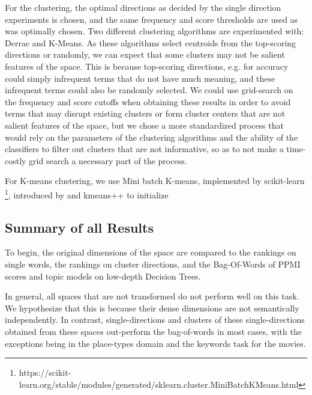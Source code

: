 For the clustering, the optimal directions as decided by the single direction experiments is chosen, and the same frequency and score thresholds are used as was optimally chosen. Two different clustering algorithms are experimented with: Derrac and K-Means. As these algorithms select centroids from the top-scoring directions or randomly, we can expect that some clusters may not be salient features of the space. This is because top-scoring directions, e.g. for accuracy could simply infrequent terms that do not have much meaning, and these infrequent terms could also be randomly selected. We could use grid-search on the frequency and score cutoffs when obtaining these results in order to avoid terms that may disrupt existing clusters or form cluster centers that are not salient features of the space, but we chose a more standardized process that would rely on the parameters of the clustering algorithms and the ability of the classifiers to filter out clusters that are not informative, so as to not make a time-costly grid search a necessary part of the process.


For K-means clustering, we use Mini batch K-means, implemented by scikit-learn \footnote{https://scikit-learn.org/stable/modules/generated/sklearn.cluster.MiniBatchKMeans.html}, introduced by \cite{Sculley2010} and kmeans++ to initialize \cite{Arthur}

\subsection{Summary of all Results}

To begin, the original dimensions of the space are compared to the rankings on single words, the rankings on cluster directions, and the Bag-Of-Words of PPMI scores and topic models on low-depth Decision Trees. 

In general, all spaces that are not transformed do not perform well on this task. We hypothesize that this is because their dense dimensions are not semantically independently. In contrast, single-directions and clusters of these single-directions obtained from these spaces out-perform the bag-of-words in most cases, with the exceptions being in the place-types domain and the keywords task for the movies. 

